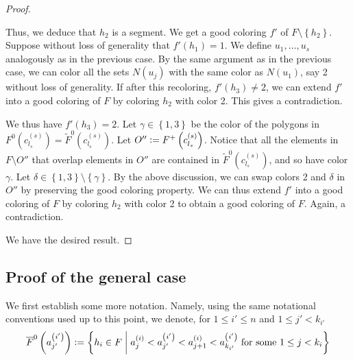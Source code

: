 \documentclass[12pt]{article}
\theoremstyle{definition}
\newcommand{\defeq}{\vcentcolon=}
\begin{document}
\begin{proof}
\begin{itemize}
             Thus, we deduce that $h_2$ is a segment.
             We get a good coloring $f'$ of
             $F \setminus \left\{h_2\right\}$.
             Suppose without loss of generality
             that $f'\left(h_1\right) = 1$.
             We define $u_1, \ldots, u_{s}$ 
             analogously as in the previous case.
             By the same argument as in the previous case,
             we can color all the sets 
             $N\left(u_{j}\right)$ with the
             same color as $N\left(u_1\right)$,
             say 2 without loss of generality.
             If after this recoloring,
             $f'\left(h_3\right) \neq 2$, 
             we can extend $f'$ into a
             good coloring of $F$ by 
             coloring $h_2$ with color 2.
             This gives a contradiction.
             
             We thus have $f'\left(h_3\right) = 2$.
             Let $\gamma \in \left\{1, 3\right\}$
             be the color of the polygons
             in $F^{0}\left(c_{l_{s}}^{\left(s\right)}\right)
             = \widetilde{F}^{0}\left(
             c_{l_{s}}^{\left(s\right)}\right)$.
             Let $O'' \defeq F^{+}\left(
             c_{l_{s}}^{\left(s\right)}\right)$.
             Notice that all the elements
             in $F \setminus O''$ 
             that overlap elements in $O''$
             are contained in $\widetilde{F}^{0}\left(
             c_{l_{s}}^{\left(s\right)}\right)$,
             and so have color $\gamma$.
             Let $\delta \in \left\{1, 3\right\}
             \setminus \left\{\gamma\right\}$.
             By the above discussion, we can swap colors
             2 and $\delta$ in $O''$
             by preserving the good coloring property.
             We can thus extend $f'$ into a
             good coloring of $F$ by
             coloring $h_2$ with color 2
             to obtain a good coloring of $F$.
             Again, a contradiction.
         \end{itemize} 
     We have the desired result. 
     \end{proof}

     \subsection{Proof of the general case}

     We first establish some more notation.
     Namely, using the same notational conventions
     used up to this point, we denote, for
     $1 \leq i' \leq n$ and $1 \leq j' < k_{i'}$
     \begin{gather*}
         \overline{F}^{0}\left(a_{j'}^{\left(i'\right)}\right) \defeq
         \left\{h_{i} \in F \;\middle|\;
         a_{j}^{\left(i\right)} <
         a_{j'}^{\left(i'\right)} <
         a_{j+1}^{\left(i\right)} <
         a_{k_{i'}}^{\left(i'\right)}
         \text{ for some }
         1 \leq j < k_{i}\right\}
     \end{gather*}
     
\end{document}
